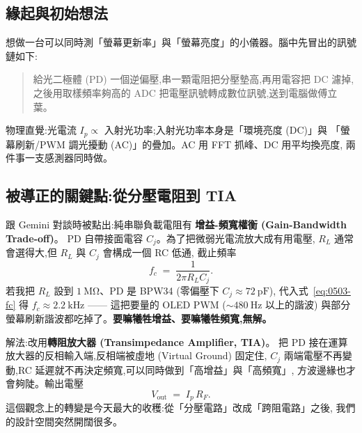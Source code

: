 
\subsection*{緣起與初始想法}

想做一台可以同時測「螢幕更新率」與「螢幕亮度」的小儀器。腦中先冒出的訊號鏈如下:

\begin{quote}
給光二極體 (PD) 一個逆偏壓,串一顆電阻把分壓墊高,再用電容把 DC 濾掉,
之後用取樣頻率夠高的 ADC 把電壓訊號轉成數位訊號,送到電腦做傅立葉。
\end{quote}

物理直覺:光電流 \(I_p \propto\) 入射光功率;入射光功率本身是「環境亮度 (DC)」與
「螢幕刷新/PWM 調光擾動 (AC)」的疊加。AC 用 FFT 抓峰、DC 用平均換亮度,
兩件事一支感測器同時做。

\subsection*{被導正的關鍵點:從分壓電阻到 TIA}

跟 Gemini 對談時被點出:純串聯負載電阻有
\textbf{增益-頻寬權衡 (Gain-Bandwidth Trade-off)}。
PD 自帶接面電容 \(C_j\)。為了把微弱光電流放大成有用電壓,
\(R_L\) 通常會選得大,但 \(R_L\) 與 \(C_j\) 會構成一個 RC 低通,
截止頻率
\begin{equation}
  f_c \;=\; \frac{1}{2\pi R_L C_j}.
  \label{eq:0503-fc}
\end{equation}
若我把 \(R_L\) 設到 \(\SI{1}{\mega\ohm}\)、PD 是 BPW34
(零偏壓下 \(C_j \approx \SI{72}{\pico\farad}\)),
代入式~\eqref{eq:0503-fc} 得 \(f_c \approx \SI{2.2}{\kilo\hertz}\) ——
這把要量的 OLED PWM (\(\sim \SI{480}{\hertz}\) 以上的諧波)
與部分螢幕刷新諧波都吃掉了。\textbf{要嘛犧牲增益、要嘛犧牲頻寬,無解。}

解法:改用\textbf{轉阻放大器 (Transimpedance Amplifier, TIA)}。
把 PD 接在運算放大器的反相輸入端,反相端被虛地 (Virtual Ground) 固定住,
\(C_j\) 兩端電壓不再變動,RC 延遲就不再決定頻寬,可以同時做到「高增益」與「高頻寬」,
方波邊緣也才會夠陡。輸出電壓
\begin{equation}
  V_\text{out} \;=\; I_p \, R_F .
  \label{eq:0503-tia}
\end{equation}
這個觀念上的轉變是今天最大的收穫:從「分壓電路」改成「跨阻電路」之後,
我們的設計空間突然開闊很多。

